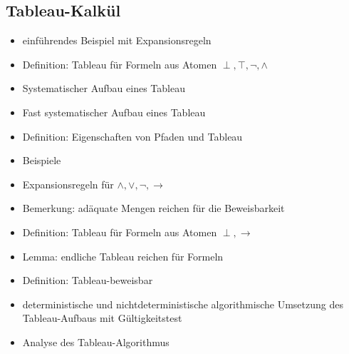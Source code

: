 \documentclass[8pt,fleqn,a4paper,twoside]{article}
\begin{document}
\begin{multicols}{2}
    \subsection{Tableau-Kalkül} %
    \label{sub:tableau_kalkül}
      \begin{itemize}
        \item einführendes Beispiel mit Expansionsregeln
        \item Definition: Tableau für Formeln aus Atomen $\perp,\top,\lnot,\land$
        \item Systematischer Aufbau eines Tableau
        \item Fast systematischer Aufbau eines Tableau
        \item Definition: Eigenschaften von Pfaden und Tableau
        \item Beispiele
        \item Expansionsregeln für $\land,\lor,\lnot,\to$
        \item Bemerkung: adäquate Mengen reichen für die Beweisbarkeit
        \item Definition: Tableau für Formeln aus Atomen $\perp,\to$
        \item Lemma: endliche Tableau reichen für Formeln
        \item Definition: Tableau-beweisbar
        \item deterministische und nichtdeterministische algorithmische Umsetzung des Tableau-Aufbaus mit Gültigkeitstest
        \item Analyse des Tableau-Algorithmus
      \end{itemize}


\end{multicols}
\end{document}
